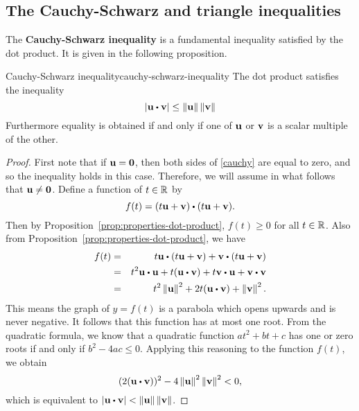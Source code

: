\subsection{The Cauchy-Schwarz and triangle inequalities}

The \textbf{Cauchy-Schwarz inequality}%
 is a fundamental
inequality satisfied by the dot product.  It is given in the following
proposition.

\begin{proposition}{Cauchy-Schwarz inequality}{cauchy-schwarz-inequality}
  The dot product satisfies the inequality
  \begin{equation}\label{cauchy}
    \abs{\vect{u}\dotprod \vect{v}}\leq \norm{\vect{u}} \norm{\vect{v}}
  \end{equation}
  Furthermore equality is obtained if and only if one of $\vect{u}$ or $\vect{v}$ is a scalar multiple of the other.
\end{proposition}

\begin{proof}
  First note that if $\vect{u}=\vect{0}$, then both sides of
  \eqref{cauchy} are equal to zero, and so the inequality holds in
  this case. Therefore, we will assume in what follows that
  $\vect{u}\neq \vect{0}$.  Define a function of $t\in \mathbb{R}$ by
  \begin{equation*}
    f(t) =(t\vect{u}+\vect{v}) \dotprod (t\vect{u}+ \vect{v}).
  \end{equation*}
  Then by Proposition~\ref{prop:properties-dot-product}, $f(t) \geq 0$
  for all $t\in \mathbb{R}$.  Also from
  Proposition~\ref{prop:properties-dot-product}, we have
  \begin{eqnarray*}
    f(t) &=&t\vect{u}\dotprod (t\vect{u}+\vect{v}) +
             \vect{v}\dotprod (t\vect{u}+\vect{v}) \\
         &=&t^2\vect{u}\dotprod \vect{u}+t(\vect{u}\dotprod \vect{v}) + t \vect{v}\dotprod \vect{u}+
             \vect{v}\dotprod \vect{v} \\
         &=&t^2\norm{\vect{u}}^2+2t(\vect{u}\dotprod \vect{v}) +\norm{
             \vect{v}}^2.
  \end{eqnarray*}
  This means the graph of $y=f(t)$ is a parabola which opens upwards
  and is never negative. It follows that this function has at most one
  root. From the quadratic formula, we know that a quadratic function
  $at^2+bt+c$ has one or zero roots if and only if $b^2-4ac\leq
  0$. Applying this reasoning to the function $f(t)$, we obtain
  \begin{equation*}
    (2(\vect{u}\dotprod \vect{v}))^2-4\norm{\vect{u}
    }^2\norm{\vect{v}}^2<0,
  \end{equation*}
  which is equivalent to
  $\abs{\vect{u}\dotprod \vect{v} }<\norm{\vect{u}} \norm{\vect{v}}$.
\end{proof}

